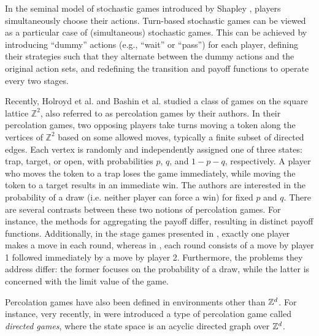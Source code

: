 	\begin{remark}
		In the seminal model of stochastic games introduced by Shapley \cite{Shapley1953}, players simultaneously choose their actions. Turn-based stochastic games can be viewed as a particular case of (simultaneous) stochastic games. This can be achieved by introducing ``dummy'' actions (e.g., ``wait'' or ``pass'') for each player, defining their strategies such that they alternate between the dummy actions and the original action sets, and redefining the transition and payoff functions to operate every two stages.
	\end{remark}

	Recently, Holroyd et al. \cite{Holroyd18} and Bashin et al. \cite{Bashin23} studied a class of games on the square lattice $\mathbb{Z}^2$, also referred to as percolation games by their authors. In their percolation games, two opposing players take turns moving a token along the vertices of $\mathbb{Z}^2$ based on some allowed moves, typically a finite subset of directed edges. Each vertex  is randomly and independently assigned one of three states: trap, target, or open, with probabilities $p$, $q$, and $1-p-q$, respectively. A player who moves the token to a trap loses the game immediately, while moving the token to a target results in an immediate win. The authors are interested in the probability of a draw (i.e. neither player can force a win) for fixed $p$ and $q$. There are several contrasts between these two notions of percolation games. For instance, the methods for aggregating the payoff differ, resulting in distinct payoff functions. Additionally, in the stage games presented in \cite{Bashin23}, exactly one player makes a move in each round, whereas in \cite{GarnierZiliotto2022}, each round consists of a move by player 1 followed immediately by a move by player 2. Furthermore, the problems they address differ: the former focuses on the probability of a draw, while the latter is concerned with the limit value of the game.

	Percolation games have also been defined in environments other than $\mathbb{Z}^d$. For instance, very recently, in \cite{Attia2024} were introduced a type of percolation game called \emph{directed games}, where the state space is an acyclic directed graph over $\mathbb{Z}^d$. 


